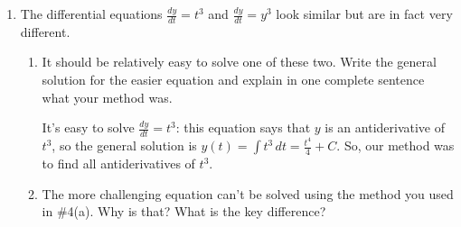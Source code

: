 \documentclass{article}
\begin{document}
\begin{enumerate}
  \begin{solution}
    We just check each one:
    \begin{enumerate}[label=\Alph*.]
    \item If $y = C e^t$, then $\frac{dy}{dt} = C e^t$ while $y + 1 = C
      e^t + 1$, so $\frac{dy}{dt} \neq y + 1$.
    \item If $y = C e^t - t$, then $\frac{dy}{dt} = C e^t - 1$ while $y +
      1 = C e^t - t + 1$, so $\frac{dy}{dt} \neq y + 1$.
    \item If $y = C (t^2 + t)$, then $\frac{dy}{dt} = C (2t + 1)$ while $y
      + 1 = C (t^2 + t) + 1$, so $\frac{dy}{dt} \neq y + 1$.
    \item If $y = C e^t - 1$, then $\frac{dy}{dt} = C e^t$ while $y + 1 =
      C e^t$, so $\frac{dy}{dt} = y + 1$.
    \item If $y = C e^{-t} + 1$, then $\frac{dy}{dt} = - C e^{-t}$ while
      $y + 1 = C e^{-t} + 2$, so $\frac{dy}{dt} \neq y + 1$. 
    \end{enumerate}
  \end{solution}

\pspace{\vfill}

\item


  The differential equations $\frac{dy}{dt} = t^3$ and $\frac{dy}{dt} =
  y^3$ look similar but are in fact very different.

  \begin{enumerate}
  \item
\begin{problem}[\vfill]
      It should be relatively easy to solve one of these two. Write the
      general solution for the easier equation and explain in one complete
      sentence what your method was.
    \end{problem}

    \begin{solution}
      It's easy to solve $\frac{dy}{dt} = t^3$: this equation says that
      $y$ is an antiderivative of $t^3$, so the general solution is $y(t) =
      \displaystyle \int t^3\,dt = \boxed{\frac{t^4}{4} + C}$.
      So, our method was to find all antiderivatives of $t^3$. 
    \end{solution}

  \item
    \begin{problem}[\vfill\newpage]
      The more challenging equation can't be solved using the method you
      used in {{{{\#4}}(a)}}. Why is that? What is the key
      difference?
    \end{problem}


\end{enumerate}
\end{enumerate}
\end{document}
